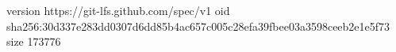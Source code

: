 version https://git-lfs.github.com/spec/v1
oid sha256:30d337e283dd0307d6dd85b4ac657c005c28efa39fbee03a3598ceeb2e1e5f73
size 173776
